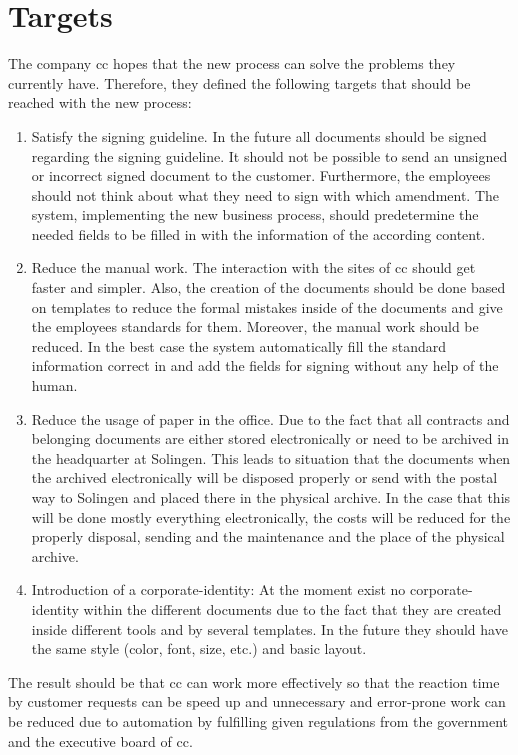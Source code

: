 \section{Targets}
The company \gls{cc} hopes that the new process can solve the problems they currently have. Therefore, they defined the following targets that should be reached with the new process:
\begin{enumerate}
	\item Satisfy the signing guideline. \newline
	In the future all documents should be signed regarding the signing guideline. It should not be possible to send an unsigned or incorrect signed document to the customer. Furthermore, the employees should not think about what they need to sign with which amendment. The system, implementing the new business process, should predetermine the needed fields to be filled in with the information of the according content.
	\item Reduce the manual work. \newline
	The interaction with the sites of \gls{cc} should get faster and simpler. Also, the creation of the documents should be done based on templates to reduce the formal mistakes inside of the documents and give the employees standards for them. Moreover, the manual work should be reduced. In the best case the system automatically fill the standard information correct in and add the fields for signing without any help of the human.  
	\item Reduce the usage of paper in the office. \newline
	Due to the fact that all contracts and belonging documents are either stored electronically or need to be archived in the headquarter at Solingen. This leads to situation that the documents when the archived electronically will be disposed properly or send with the postal way to Solingen and placed there in the physical archive. In the case that this will be done mostly everything electronically, the costs will be reduced for the properly disposal, sending and the maintenance and the place of the physical archive. 
	\item Introduction of a corporate-identity: \newline
	At the moment exist no corporate-identity within the different documents due to the fact that they are created inside different tools and by several templates. In the future they should have the same style (color, font, size, etc.) and basic layout.
\end{enumerate}
The result should be that \gls{cc} can work more effectively so that the reaction time by customer requests can be speed up and unnecessary and error-prone work can be reduced due to automation by fulfilling given regulations from the government and the executive board of \gls{cc}.

